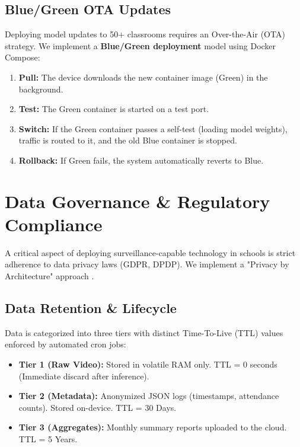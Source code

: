\documentclass[conference]{IEEEtran}
\begin{document}
\subsection{Blue/Green OTA Updates}
Deploying model updates to 50+ classrooms requires an Over-the-Air (OTA) strategy. We implement a \textbf{Blue/Green deployment} model using Docker Compose:
\begin{enumerate}
\item \textbf{Pull:} The device downloads the new container image (Green) in the background.
\item \textbf{Test:} The Green container is started on a test port.
\item \textbf{Switch:} If the Green container passes a self-test (loading model weights), traffic is routed to it, and the old Blue container is stopped.
\item \textbf{Rollback:} If Green fails, the system automatically reverts to Blue.
\end{enumerate}

\section{Data Governance \& Regulatory Compliance}

A critical aspect of deploying surveillance-capable technology in schools is strict adherence to data privacy laws (GDPR, DPDP). We implement a "Privacy by Architecture" approach \cite{b9}.

\subsection{Data Retention \& Lifecycle}
Data is categorized into three tiers with distinct Time-To-Live (TTL) values enforced by automated cron jobs:
\begin{itemize}
    \item \textbf{Tier 1 (Raw Video):} Stored in volatile RAM only. TTL = 0 seconds (Immediate discard after inference).
    \item \textbf{Tier 2 (Metadata):} Anonymized JSON logs (timestamps, attendance counts). Stored on-device. TTL = 30 Days.
    \item \textbf{Tier 3 (Aggregates):} Monthly summary reports uploaded to the cloud. TTL = 5 Years.
\end{itemize}
\end{document}
